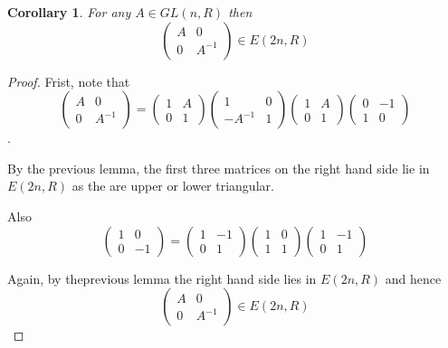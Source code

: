\documentclass[a4paper,10pt]{article}
\newtheorem{cor}[thm]{Corollary}
\begin{document}
\begin{cor}
For any $A\in GL(n,R)$ then $$\left(\begin{array}{cc} A & 0 \\ 0 & A^{-1} \end{array}\right)\in E(2n,R)$$
\end{cor}
\begin{proof}
Frist, note that $$\left(\begin{array}{cc} A & 0 \\ 0 & A^{-1} \end{array}\right)=
\left(\begin{array}{cc} 1 & A \\ 0 & 1 \end{array}\right)
\left(\begin{array}{cc} 1 & 0 \\ -A^{-1} & 1 \end{array}\right)
\left(\begin{array}{cc} 1 & A \\ 0 & 1 \end{array}\right)
\left(\begin{array}{cc} 0 & -1 \\ 1 & 0 \end{array}\right)$$.

By the previous lemma, the first three matrices on the right hand side lie in $E(2n,R)$ as the are upper or lower triangular.

Also $$\left(\begin{array}{cc} 1 & 0 \\ 0 & -1 \end{array}\right)=
\left(\begin{array}{cc} 1 & -1 \\ 0 & 1 \end{array}\right)
\left(\begin{array}{cc} 1 & 0 \\ 1 & 1 \end{array}\right)
\left(\begin{array}{cc} 1 & -1 \\ 0 & 1 \end{array}\right)$$

Again, by theprevious lemma the right hand side lies in $E(2n,R)$ and hence
$$\left(\begin{array}{cc} A & 0 \\ 0 & A^{-1} \end{array}\right)\in E(2n,R)$$
\end{proof}
\end{document}
